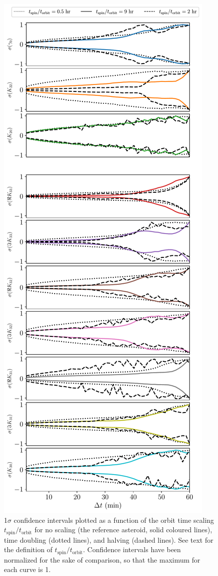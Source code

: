 \documentclass[fleqn,usenatbib]{mnras}
\begin{document}
\begin{figure}
  \centering
  \includegraphics[height=0.89\textheight]{figs/cad-speed.pdf}
  \caption{1$\sigma$ confidence intervals plotted as a function of the orbit time scaling $t_\text{spin}/t_\text{orbit}$ for no scaling (the reference asteroid, solid coloured lines), time doubling (dotted lines), and halving (dashed lines). See text for the definition of $t_\text{spin}/t_\text{orbit}$. Confidence intervals have been normalized for the sake of comparison, so that the maximum for each curve is 1.}
  \label{fig:cad-speed}
\end{figure}
\end{document}
